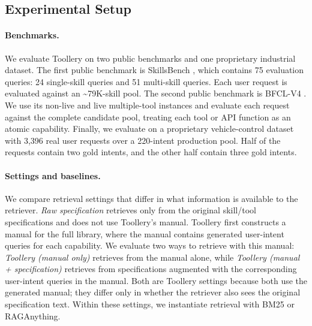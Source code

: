 \documentclass[11pt]{article}
\begin{document}
\subsection{Experimental Setup}
\label{subsec:experimental-setup}

\paragraph{Benchmarks.}
We evaluate Toollery on two public benchmarks and one proprietary industrial dataset. The first public benchmark is SkillsBench \citep{li2026skillsbench, zheng2026skillrouter}, which contains 75 evaluation queries: 24 single-skill queries and 51 multi-skill queries. Each user request is evaluated against an \textasciitilde{}79K-skill pool. The second public benchmark is BFCL-V4 \citep{patil2024gorilla}. We use its non-live and live multiple-tool instances and evaluate each request against the complete candidate pool, treating each tool or API function as an atomic capability. Finally, we evaluate on a proprietary vehicle-control dataset with 3,396 real user requests over a 220-intent production pool. Half of the requests contain two gold intents, and the other half contain three gold intents.

\paragraph{Settings and baselines.}
We compare retrieval settings that differ in what information is available to the retriever. \emph{Raw specification} retrieves only from the original skill/tool specifications and does not use Toollery's manual. Toollery first constructs a manual for the full library, where the manual contains generated user-intent queries for each capability. We evaluate two ways to retrieve with this manual: \emph{Toollery (manual only)} retrieves from the manual alone, while \emph{Toollery (manual + specification)} retrieves from specifications augmented with the corresponding user-intent queries in the manual. Both are Toollery settings because both use the generated manual; they differ only in whether the retriever also sees the original specification text. Within these settings, we instantiate retrieval with BM25 or RAGAnything.
\end{document}
